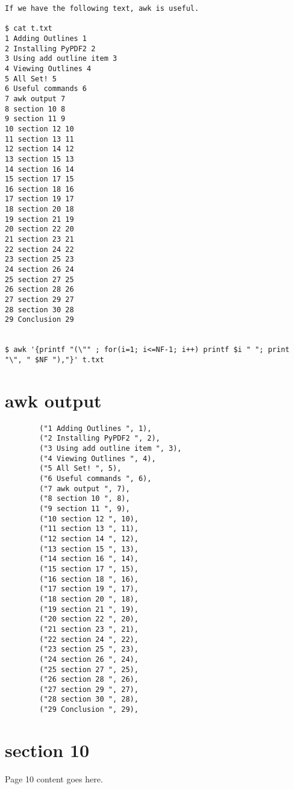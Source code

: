 \documentclass{article}
\begin{document}
\begin{verbatim}
If we have the following text, awk is useful.

$ cat t.txt
1 Adding Outlines 1
2 Installing PyPDF2 2
3 Using add outline item 3
4 Viewing Outlines 4
5 All Set! 5
6 Useful commands 6
7 awk output 7
8 section 10 8
9 section 11 9
10 section 12 10
11 section 13 11
12 section 14 12
13 section 15 13
14 section 16 14
15 section 17 15
16 section 18 16
17 section 19 17
18 section 20 18
19 section 21 19
20 section 22 20
21 section 23 21
22 section 24 22
23 section 25 23
24 section 26 24
25 section 27 25
26 section 28 26
27 section 29 27
28 section 30 28
29 Conclusion 29


$ awk '{printf "(\"" ; for(i=1; i<=NF-1; i++) printf $i " "; print "\", " $NF "),"}' t.txt
\end{verbatim}



\newpage

\section{awk output}

\begin{verbatim}
        ("1 Adding Outlines ", 1),
        ("2 Installing PyPDF2 ", 2),
        ("3 Using add outline item ", 3),
        ("4 Viewing Outlines ", 4),
        ("5 All Set! ", 5),
        ("6 Useful commands ", 6),
        ("7 awk output ", 7),
        ("8 section 10 ", 8),
        ("9 section 11 ", 9),
        ("10 section 12 ", 10),
        ("11 section 13 ", 11),
        ("12 section 14 ", 12),
        ("13 section 15 ", 13),
        ("14 section 16 ", 14),
        ("15 section 17 ", 15),
        ("16 section 18 ", 16),
        ("17 section 19 ", 17),
        ("18 section 20 ", 18),
        ("19 section 21 ", 19),
        ("20 section 22 ", 20),
        ("21 section 23 ", 21),
        ("22 section 24 ", 22),
        ("23 section 25 ", 23),
        ("24 section 26 ", 24),
        ("25 section 27 ", 25),
        ("26 section 28 ", 26),
        ("27 section 29 ", 27),
        ("28 section 30 ", 28),
        ("29 Conclusion ", 29),
\end{verbatim}


\newpage

\section{section 10}
Page 10 content goes here.
\newpage
\end{document}
